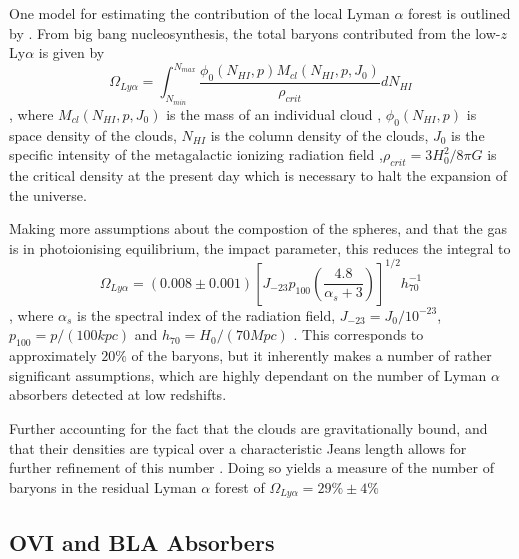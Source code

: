 \par One model for estimating the contribution of the local Lyman $\alpha$ forest is outlined by \cite{2000ApJ...544..150P}. From big bang nucleosynthesis, the total baryons contributed from the low-$z$ Ly$\alpha$ is given by 
$$\Omega_{Ly\alpha} = \int_{N_{min}}^{N_{max}} \frac{ \phi_0(N_{HI},p) M_{cl}(N_{HI}, p, J_0)}{\rho_{crit}} dN_{HI} $$
, where $M_{cl}(N_{HI}, p, J_0)$ is the mass of an individual cloud , $\phi_0(N_{HI},p)$ is space density of the clouds, $N_{HI}$ is the column density of the clouds, $J_0$ is the specific intensity of the metagalactic ionizing radiation field ,$\rho_{crit} = 3 H_0^2/8 \pi G $ is the critical density at the present day which is necessary to halt the expansion of the universe.
\par Making more assumptions about the compostion of the spheres, and that the gas is in photoionising equilibrium, the impact parameter, this reduces the integral to
$$\Omega_{Ly\alpha} = (0.008 \pm 0.001) \left[ J_{-23} p_100 \left(\frac{ 4.8}{ \alpha_s + 3} \right) \right]^{1/2} h_{70}^{-1} $$
, where $\alpha_s$ is the spectral index of the radiation field, $J_{-23}= J_0/10^{-23}$, $p_{100} = p/(100 kpc)$ and $h_{70} = H_0/(70 Mpc)$ . This corresponds to approximately $20\%$ of the baryons, but it inherently makes a number of rather significant assumptions, which are highly dependant on the number of Lyman $\alpha$ absorbers detected at low redshifts. 
\par Further accounting for the fact that the clouds are gravitationally bound, and that their densities are typical over a characteristic Jeans length allows for further refinement of this number \citep{2001ApJ...559..507S}. Doing so yields a measure of the number of baryons in the residual Lyman $\alpha$ forest of $\Omega_{Ly\alpha} = 29 \% \pm 4\%$ \citep{ 2004ApJS..152...29P,2008ApJ...679..194D}  
\subsection{OVI and BLA Absorbers}

